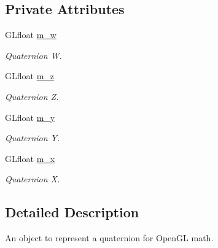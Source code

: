 \subsection*{Private Attributes}
\begin{DoxyCompactItemize}
\item 
\hypertarget{classgl_quaternion_a922203e3da7551bce6cb52bd88680a2b}{
GLfloat \hyperlink{classgl_quaternion_a922203e3da7551bce6cb52bd88680a2b}{m\_\-w}}
\label{classgl_quaternion_a922203e3da7551bce6cb52bd88680a2b}

\begin{DoxyCompactList}\small\item\em Quaternion W. \end{DoxyCompactList}\item 
\hypertarget{classgl_quaternion_aee4aea16f758432eaa97f3b6d9ac911c}{
GLfloat \hyperlink{classgl_quaternion_aee4aea16f758432eaa97f3b6d9ac911c}{m\_\-z}}
\label{classgl_quaternion_aee4aea16f758432eaa97f3b6d9ac911c}

\begin{DoxyCompactList}\small\item\em Quaternion Z. \end{DoxyCompactList}\item 
\hypertarget{classgl_quaternion_a27c7ace16ec44354957c7532a381f68f}{
GLfloat \hyperlink{classgl_quaternion_a27c7ace16ec44354957c7532a381f68f}{m\_\-y}}
\label{classgl_quaternion_a27c7ace16ec44354957c7532a381f68f}

\begin{DoxyCompactList}\small\item\em Quaternion Y. \end{DoxyCompactList}\item 
\hypertarget{classgl_quaternion_aad569bf001fdf8f78e7b66724cbaac8f}{
GLfloat \hyperlink{classgl_quaternion_aad569bf001fdf8f78e7b66724cbaac8f}{m\_\-x}}
\label{classgl_quaternion_aad569bf001fdf8f78e7b66724cbaac8f}

\begin{DoxyCompactList}\small\item\em Quaternion X. \end{DoxyCompactList}\end{DoxyCompactItemize}


\subsection{Detailed Description}
An object to represent a quaternion for OpenGL math. 

